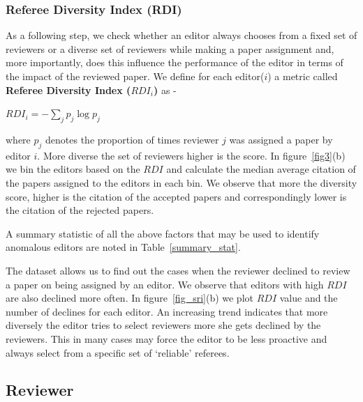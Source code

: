\subsubsection{Referee Diversity Index (RDI)}
As a following step, we check whether an editor always chooses from a fixed set of reviewers or a diverse set of reviewers while making a paper assignment and, more importantly, does this influence the performance of the editor in terms of the impact of the reviewed paper. We define for each editor($i$) a metric called {\bf Referee Diversity Index ($RDI_{i}$)} as -  
\begin{center}
$RDI_{i}=-\sum \limits_{j} p_{j}\log p_{j}$
\end{center}
where $p_{j}$ denotes the proportion of times reviewer $j$ was assigned a paper by editor $i$. More diverse the set of reviewers higher is the score. In figure~\ref{fig3}(b) we bin the editors based on the $RDI$ and calculate the median average citation of the papers assigned to the editors in each bin. We observe that more the diversity score, higher is the citation of the accepted papers and correspondingly lower is the citation of the rejected papers.

A summary statistic of all the above factors that may be used to identify anomalous editors are noted in Table~\ref{summary_stat}.

The dataset allows us to find out the cases when the reviewer declined to review a paper on being assigned by an editor. We observe that editors with high $RDI$ are also declined more often. In figure~\ref{fig_sri}(b) we plot $RDI$ value and the number of declines for each editor. An increasing trend indicates that more diversely the editor tries to select reviewers more she gets declined by the reviewers. This in many cases may force the editor to be less proactive and always select from a specific set of `reliable' referees.  


%

\subsection{Reviewer}
\label{reviewer}

